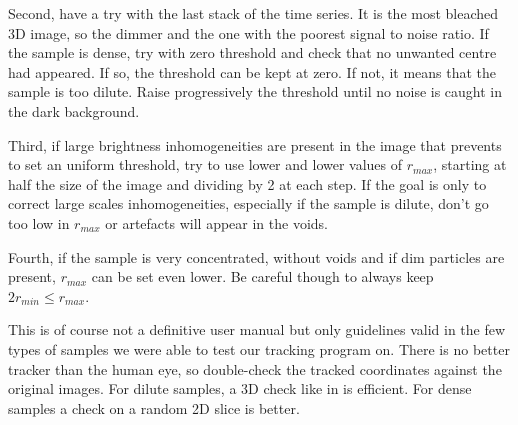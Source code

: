 Second, have a try with the last stack of the time series. It is the most bleached 3D image, so the dimmer and the one with the poorest signal to noise ratio. If the sample is dense, try with zero threshold and check that no unwanted centre had appeared. If so, the threshold can be kept at zero. If not, it means that the sample is too dilute. Raise progressively the threshold until no noise is caught in the dark background.

Third, if large brightness inhomogeneities are present in the image that prevents to set an uniform threshold, try to use lower and lower values of $r_{max}$, starting at half the size of the image and dividing by 2 at each step. If the goal is only to correct large scales inhomogeneities, especially if the sample is dilute, don't go too low in $r_{max}$ or artefacts will appear in the voids. 

Fourth, if the sample is very concentrated, without voids and if dim particles are present, $r_{max}$ can be set even lower. Be careful though to always keep $2r_{min} \leq r_{max}$.

This is of course not a definitive user manual but only guidelines valid in the few types of samples we were able to test our tracking program on. There is no better tracker than the human eye, so double-check the tracked coordinates against the original images. For dilute samples, a 3D check like in  is efficient. For dense samples a check on a random 2D slice is better.

